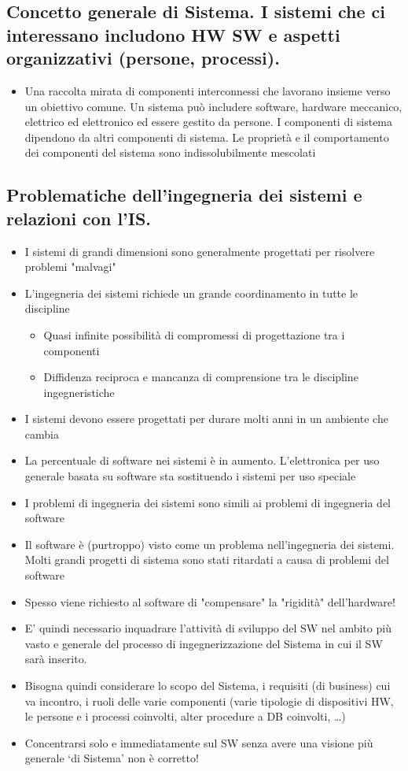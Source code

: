 \subsection{Concetto generale di Sistema. I sistemi che ci interessano includono HW SW e aspetti organizzativi (persone, processi).}
\begin{itemize}
    \item Una raccolta mirata di componenti interconnessi che lavorano insieme verso un obiettivo comune. Un sistema può includere software, hardware meccanico, elettrico ed elettronico ed essere gestito da persone. I componenti di sistema dipendono da altri componenti di sistema. Le proprietà e il comportamento dei componenti del sistema sono indissolubilmente mescolati
\end{itemize}
\subsection{Problematiche dell’ingegneria dei sistemi e relazioni con l’IS.}
\begin{itemize}
    \item I sistemi di grandi dimensioni sono generalmente progettati per risolvere problemi "malvagi"
    \item L'ingegneria dei sistemi richiede un grande coordinamento in tutte le discipline
    \begin{itemize}
        \item Quasi infinite possibilità di compromessi di progettazione tra i componenti
        \item Diffidenza reciproca e mancanza di comprensione tra le discipline ingegneristiche
    \end{itemize}
    \item I sistemi devono essere progettati per durare molti anni in un ambiente che cambia
    \item La percentuale di software nei sistemi è in aumento. L'elettronica per uso generale basata su software sta sostituendo i sistemi per uso speciale
    \item I problemi di ingegneria dei sistemi sono simili ai problemi di ingegneria del software
    \item Il software è (purtroppo) visto come un problema nell'ingegneria dei sistemi. Molti grandi progetti di sistema sono stati ritardati a causa di problemi del software
    \item Spesso viene richiesto al software di "compensare" la "rigidità" dell'hardware!
    \item E’ quindi necessario inquadrare l’attività di sviluppo del SW nel ambito più vasto e generale del processo di ingegnerizzazione del Sistema in cui il SW sarà inserito.
    \item Bisogna quindi considerare lo scopo del Sistema, i requisiti (di business) cui va incontro, i ruoli delle varie componenti (varie tipologie di dispositivi HW, le persone e i processi coinvolti, alter procedure a DB coinvolti, …)
    \item Concentrarsi solo e immediatamente sul SW senza avere una visione più generale ‘di Sistema’ non è corretto!
\end{itemize}
